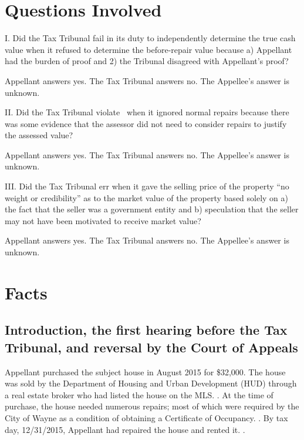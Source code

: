 \documentclass[12pt,\documentclassflag]{michiganCourtOfAppealsBrief}
\begin{document}


\newpage 
\section{Questions Involved}

\noindent I. Did the Tax Tribunal fail in its duty to independently determine the true cash value when it refused to determine the before-repair value because a) Appellant had the burden of proof and 2) the Tribunal disagreed with Appellant's proof?

Appellant answers yes. The Tax Tribunal answers no. The Appellee's answer is unknown. 
\vspace{\baselineskip}

\noindent II. Did the Tax Tribunal violate \mathieuGast\ when it ignored normal repairs because there was some evidence that the assessor did not need to consider repairs to justify the assessed value?

Appellant answers yes. The Tax Tribunal answers no. The Appellee's answer is unknown.

\vspace{\baselineskip}

\noindent III. Did the Tax Tribunal err when it gave the selling price of the property ``no weight or credibility'' as to the market value of the property based solely on a) the fact that the seller was a government entity and b) speculation that the seller may not have been motivated to receive market value?

Appellant answers yes. The Tax Tribunal answers no. The Appellee's answer is unknown. 
 
\newpage

\section{Facts}
\label{facts}
\subsection{Introduction, the first hearing before the Tax Tribunal, and reversal by the Court of Appeals}

Appellant purchased the subject house in August 2015 for \$32,000. The house was sold by the Department of Housing and Urban Development (HUD) through a real estate broker who had listed the house on the MLS. \mlsListing[]. At the time of purchase, the house needed numerous repairs; most of which were required by the City of Wayne as a condition of obtaining a Certificate of Occupancy. \repairs[]. By tax day, 12/31/2015, Appellant had repaired the house and rented it. \foj[4-5].
\end{document}
